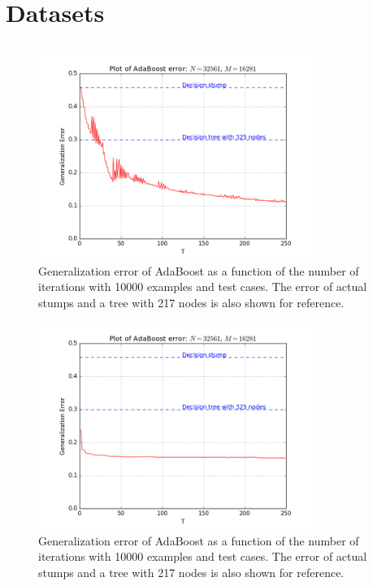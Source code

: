\newpage
\section{Datasets}
\subsection{\adaB}
\label{subsec:AdaPracPerf}

\begin{figure}[!ht]
  \centering
      \includegraphics[width=0.8\textwidth]{generated/ADGD.png}
  \caption{Generalization error of AdaBoost as a function of the number of iterations with 10000 examples and test cases. The error of actual stumps and a tree with 217 nodes is also shown for reference.}
      \label{fig:adaB}
\end{figure}

\begin{figure}[!ht]
  \centering
      \includegraphics[width=0.8\textwidth]{generated/ADSVM.png}
  \caption{Generalization error of AdaBoost as a function of the number of iterations with 10000 examples and test cases. The error of actual stumps and a tree with 217 nodes is also shown for reference.}
      \label{fig:adaB}
\end{figure}


